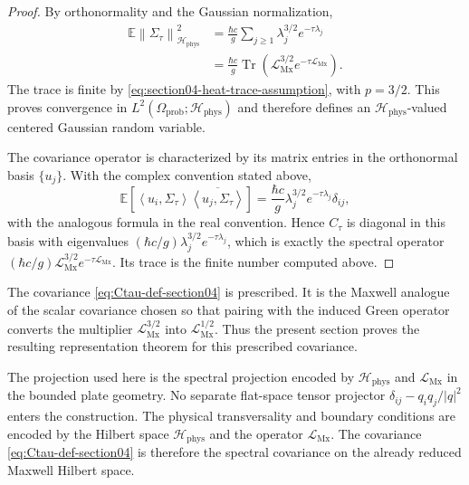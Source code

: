\documentclass[11pt]{article}
\providecommand{\hbarc}{\hbar c}
\providecommand{\E}{\mathbb{E}}
\providecommand{\Tr}{\operatorname{Tr}}
\providecommand{\abs}[1]{\left\lvert #1\right\rvert}
\providecommand{\norm}[1]{\left\lVert #1\right\rVert}
\providecommand{\inner}[2]{\left\langle #1,#2\right\rangle}
\providecommand{\paren}[1]{\left(#1\right)}
\providecommand{\brac}[1]{\left[#1\right]}
\providecommand{\Hphys}{\mathcal H_{\mathrm{phys}}}
\providecommand{\LMx}{\mathcal L_{\mathrm{Mx}}}
\providecommand{\Sigmatau}{\Sigma_{\tau}}
\providecommand{\Ctau}{C_{\tau}}
\numberwithin{equation}{section}
\begin{document}
\begin{proof}
By orthonormality and the Gaussian normalization,
\begin{align*}
    \E\norm{\Sigmatau}_{\Hphys}^2
    &=
    \frac{\hbarc}{g}
    \sum_{j\geq1}\lambda_j^{3/2}e^{-\tau\lambda_j}          \\
    &=
    \frac{\hbarc}{g}
    \Tr\paren{\LMx^{3/2}e^{-\tau\LMx}} .
\end{align*}
The trace is finite by \eqref{eq:section04-heat-trace-assumption}, with
\(p=3/2\).  This proves convergence in
\(L^2(\Omega_{\mathrm{prob}};\Hphys)\) and therefore defines an
\(\Hphys\)-valued centered Gaussian random variable.

The covariance operator is characterized by its matrix entries in the
orthonormal basis \(\{u_j\}\).  With the complex convention stated above,
\[
    \E\!\brac{
        \inner{u_i}{\Sigmatau}
        \overline{\inner{u_j}{\Sigmatau}}
    }
    =
    \frac{\hbarc}{g}
    \lambda_j^{3/2}e^{-\tau\lambda_j}\delta_{ij},
\]
with the analogous formula in the real convention.  Hence \(\Ctau\) is diagonal
in this basis with eigenvalues
\((\hbarc/g)\lambda_j^{3/2}e^{-\tau\lambda_j}\), which is exactly the spectral
operator \((\hbarc/g)\LMx^{3/2}e^{-\tau\LMx}\).  Its trace is the finite number
computed above.
\end{proof}

\begin{remark}
\label{rem:maxwell-covariance-prescribed}
The covariance \eqref{eq:Ctau-def-section04} is prescribed.  It is the Maxwell
analogue of the scalar covariance chosen so that pairing with the induced Green
operator converts the multiplier \(\LMx^{3/2}\) into \(\LMx^{1/2}\).  Thus the
present section proves the resulting representation theorem for this prescribed
covariance.
\end{remark}

\begin{remark}
\label{rem:no-flat-projector}
The projection used here is the spectral projection encoded by \(\Hphys\) and
\(\LMx\) in the bounded plate geometry.  No separate flat-space tensor
projector \(\delta_{ij}-q_iq_j/\abs{q}^2\) enters the construction.  The
physical transversality and boundary conditions are encoded by the Hilbert
space \(\Hphys\) and the operator \(\LMx\).  The
covariance \eqref{eq:Ctau-def-section04} is therefore the spectral covariance
on the already reduced Maxwell Hilbert space.
\end{remark}
\end{document}
